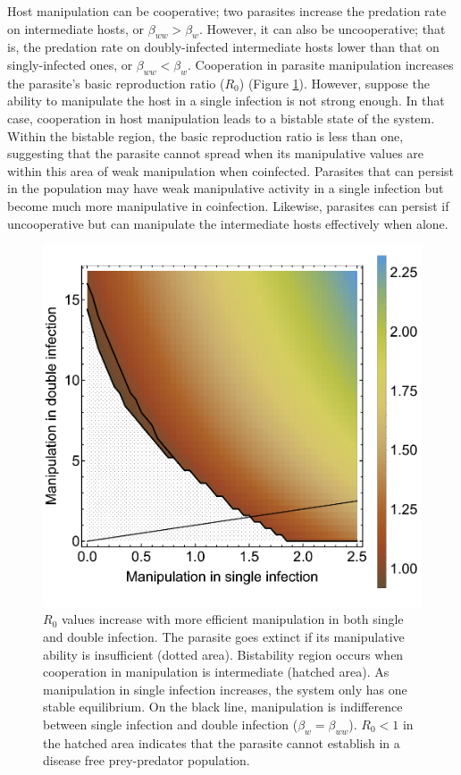 \documentclass[11pt]{article}
\begin{document}
Host manipulation can be cooperative; two parasites increase the predation rate on intermediate hosts, or $\beta_{ww} > \beta_w$. 
However, it can also be uncooperative; that is, the predation rate on doubly-infected intermediate hosts lower than that on singly-infected ones, or $\beta_{ww} < \beta_w$.
Cooperation in parasite manipulation increases the parasite's basic reproduction ratio ($R_0$) (Figure \ref{fig:manipR0}). 
However, suppose the ability to manipulate the host in a single infection is not strong enough. 
In that case, cooperation in host manipulation leads to a bistable state of the system. 
Within the bistable region, the basic reproduction ratio is less than one, suggesting that the parasite cannot spread when its manipulative values are within this area of weak manipulation when coinfected. 
Parasites that can persist in the population may have weak manipulative activity in a single infection but become much more manipulative in coinfection. 
Likewise, parasites can persist if uncooperative but can manipulate the intermediate hosts effectively when alone.

\begin{figure}
\centering
\includegraphics[width=\textwidth]{Figures/manip_bifur_R0.pdf}
\caption{$R_0$ values increase with more efficient manipulation in both single and double infection. The parasite goes extinct if its manipulative ability is insufficient (dotted area). Bistability region occurs when cooperation in manipulation is intermediate (hatched area). As manipulation in single infection increases, the system only has one stable equilibrium. On the black line, manipulation is indifference between single infection and double infection ($\beta_w = \beta_{ww}$). $R_0 < 1$ in the hatched area indicates that the parasite cannot establish in a disease free prey-predator population.}
\label{fig:manipR0}
\end{figure}
\end{document}
